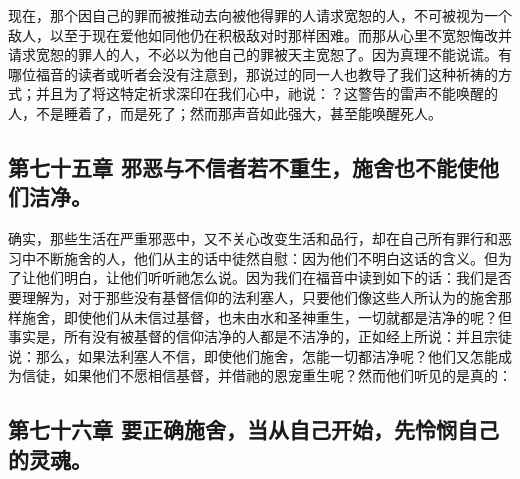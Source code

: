 现在，那个因自己的罪而被推动去向被他得罪的人请求宽恕的人，不可被视为一个敌人，以至于现在爱他如同他仍在积极敌对时那样困难。而那从心里不宽恕悔改并请求宽恕的罪人的人，不必以为他自己的罪被天主宽恕了。因为真理不能说谎。有哪位福音的读者或听者会没有注意到，那说过的同一人也教导了我们这种祈祷的方式；并且为了将这特定祈求深印在我们心中，祂说：？这警告的雷声不能唤醒的人，不是睡着了，而是死了；然而那声音如此强大，甚至能唤醒死人。\par


\subsection{第七十五章 邪恶与不信者若不重生，施舍也不能使他们洁净。}

确实，那些生活在严重邪恶中，又不关心改变生活和品行，却在自己所有罪行和恶习中不断施舍的人，他们从主的话中徒然自慰：因为他们不明白这话的含义。但为了让他们明白，让他们听听祂怎么说。因为我们在福音中读到如下的话：我们是否要理解为，对于那些没有基督信仰的法利塞人，只要他们像这些人所认为的施舍那样施舍，即使他们从未信过基督，也未由水和圣神重生，一切就都是洁净的呢？但事实是，所有没有被基督的信仰洁净的人都是不洁净的，正如经上所说：并且宗徒说：那么，如果法利塞人不信，即使他们施舍，怎能一切都洁净呢？他们又怎能成为信徒，如果他们不愿相信基督，并借祂的恩宠重生呢？然而他们听见的是真的：\par


\subsection{第七十六章 要正确施舍，当从自己开始，先怜悯自己的灵魂。}

